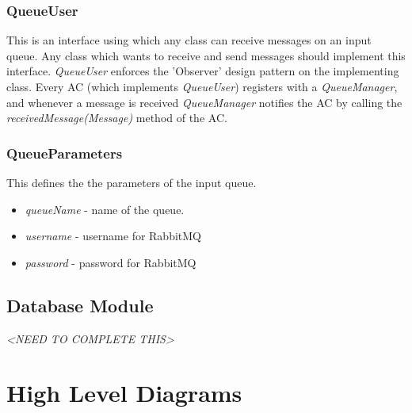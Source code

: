 \subsubsection{ QueueUser }
This is an interface using which any class can receive messages on an
input queue. Any class which wants to receive and send messages should
implement this interface. \textit{QueueUser} enforces the 'Observer'
design pattern on the implementing class. Every AC (which implements
\textit{QueueUser}) registers with a \textit{QueueManager}, and
whenever a message is received \textit{QueueManager} notifies the AC
by calling the \textit{receivedMessage(Message)} method of the AC.

\subsubsection{ QueueParameters }
This defines the the parameters of the input queue.
\begin{itemize}
\item \textit{queueName} - name of the queue.
\item \textit{username} - username for RabbitMQ 
\item \textit{password} - password for RabbitMQ
\end{itemize}

\subsection{ Database Module }
\textit{<NEED TO COMPLETE THIS>}

\section{ High Level Diagrams}
